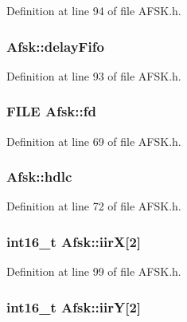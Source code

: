 Definition at line 94 of file A\+F\+S\+K.\+h.

\subsubsection[{\texorpdfstring{delay\+Fifo}{delayFifo}}]{ Afsk\+::delay\+Fifo}\hypertarget{struct_afsk_a326b5be68b2c9bb6191ac8d76a021999}{}\label{struct_afsk_a326b5be68b2c9bb6191ac8d76a021999}


Definition at line 93 of file A\+F\+S\+K.\+h.

\subsubsection[{\texorpdfstring{fd}{fd}}]{\setlength{\rightskip}{0pt plus 5cm}F\+I\+LE Afsk\+::fd}\hypertarget{struct_afsk_a539f9d0fd0fcdd2523aa9b5694207288}{}\label{struct_afsk_a539f9d0fd0fcdd2523aa9b5694207288}


Definition at line 69 of file A\+F\+S\+K.\+h.

\subsubsection[{\texorpdfstring{hdlc}{hdlc}}]{ Afsk\+::hdlc}\hypertarget{struct_afsk_a0f2cf84d5882a74b33b54828e4adda6d}{}\label{struct_afsk_a0f2cf84d5882a74b33b54828e4adda6d}


Definition at line 72 of file A\+F\+S\+K.\+h.

\subsubsection[{\texorpdfstring{iirX}{iirX}}]{\setlength{\rightskip}{0pt plus 5cm}int16\+\_\+t Afsk\+::iirX\mbox{[}2\mbox{]}}\hypertarget{struct_afsk_a02560c20963adab17b0706c8c69f2ed3}{}\label{struct_afsk_a02560c20963adab17b0706c8c69f2ed3}


Definition at line 99 of file A\+F\+S\+K.\+h.

\subsubsection[{\texorpdfstring{iirY}{iirY}}]{\setlength{\rightskip}{0pt plus 5cm}int16\+\_\+t Afsk\+::iirY\mbox{[}2\mbox{]}}\hypertarget{struct_afsk_a454754399c47bf3514ffc495832b5391}{}\label{struct_afsk_a454754399c47bf3514ffc495832b5391}


